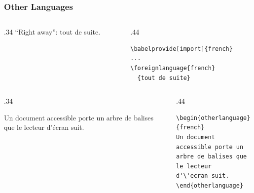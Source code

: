 \documentclass{ltx-talk}
\begin{document}
\begin{frame*}
  \frametitle{Other Languages}
  \begin{columns}
    \begin{column}{.34\textwidth}
      ``Right away'': \foreignlanguage{french}{tout de suite}.
    \end{column}
    \begin{column}{.44\textwidth}
\small
\begin{verbatim}
\babelprovide[import]{french}
...
\foreignlanguage{french}
  {tout de suite}
\end{verbatim}
    \end{column}
  \end{columns}

  \begin{columns}
    \begin{column}{.34\textwidth}
      \begin{otherlanguage}{french}
      Un document accessible porte un arbre de balises que le lecteur
      d'\'ecran suit.
      \end{otherlanguage}
    \end{column}
    \begin{column}{.44\textwidth}
\small
\begin{verbatim}
\begin{otherlanguage}{french}
Un document accessible porte un
arbre de balises que le lecteur
d'\'ecran suit.
\end{otherlanguage}
\end{verbatim}
    \end{column}
  \end{columns}
\end{frame*}
\end{document}
